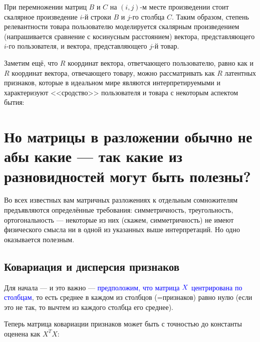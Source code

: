 \documentclass{amsart}
\theoremstyle{definition}
\theoremstyle{remark}
\numberwithin{equation}{section}
\begin{document}
\begin{center}
\end{center}

При перемножении матриц $B$ и $C$ на $(i, j)$-м месте произведении стоит скалярное произведение $i$-й строки $B$ и $j$-го столбца $C$. Таким образом, степень релевантности товара пользователю моделируется скалярным произведением (напрашивается сравнение с косинусным расстоянием) вектора, представляющего $i$-го пользователя, и вектора, представляющего $j$-й товар.

\begin{center}
\end{center}

Заметим ещё, что $R$ координат вектора, ответчающего пользователю, равно как и $R$ координат вектора, отвечающего товару, можно рассматривать как $R$ латентных признаков, которые в идеальном мире являются интерпретируемыми и характеризуют <<сродство>> пользователя и товара с некоторым аспектом бытия:

\begin{center}
\end{center}

\section{Но матрицы в разложении обычно не абы какие --- так какие из разновидностей могут быть полезны?}

Во всех известных вам матричных разложениях к отдельным сомножителям предъявляются определённые требования: симметричность, треугольность, ортогональность --- некоторые из них (скажем, симметричность) не имеют физического смысла ни в одной из указанных выше интерпретаций. Но одно оказывается полезным.

\subsection{Ковариация и дисперсия признаков} Для начала --- и это важно --- \textcolor{blue}{предположим, что матрица $\textcolor{blue}{X}$ центрирована по столбцам}, то есть среднее в каждом из столбцов (=признаков) равно нулю (если это не так, то вычтем из каждого столбца его среднее).

Теперь матрица ковариации признаков может быть с точностью до константы оценена как $X^TX$:
\end{document}

